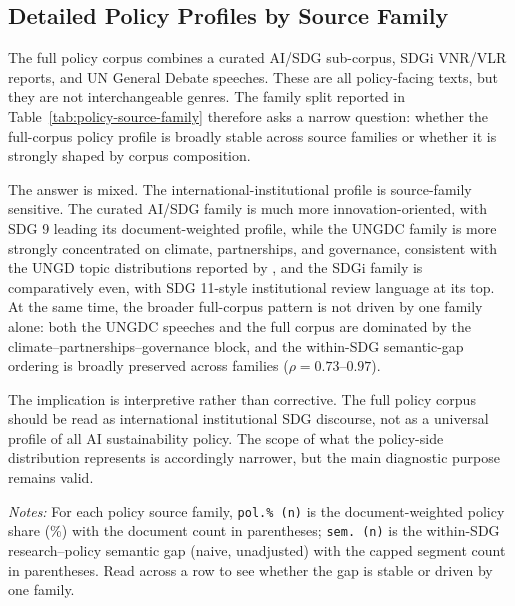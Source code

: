 \documentclass[12pt,a4paper]{article}
\begin{document}
\subsection{Detailed Policy Profiles by Source Family}
\label{app:policy-source-data}

The full policy corpus combines a curated AI/SDG sub-corpus, SDGi VNR/VLR reports, and UN General Debate speeches. These are all policy-facing texts, but they are not interchangeable genres. The family split reported in Table~\ref{tab:policy-source-family} therefore asks a narrow question: whether the full-corpus policy profile is broadly stable across source families or whether it is strongly shaped by corpus composition.

The answer is mixed. The international-institutional profile is source-family sensitive. The curated AI/SDG family is much more innovation-oriented, with SDG 9 leading its document-weighted profile, while the UNGDC family is more strongly concentrated on climate, partnerships, and governance, consistent with the UNGD topic distributions reported by \textcite{JankinEtAl2024}, and the SDGi family is comparatively even, with SDG 11-style institutional review language at its top. At the same time, the broader full-corpus pattern is not driven by one family alone: both the UNGDC speeches and the full corpus are dominated by the climate--partnerships--governance block, and the within-SDG semantic-gap ordering is broadly preserved across families ($\rho = 0.73$--$0.97$).

The implication is interpretive rather than corrective. The full policy corpus should be read as international institutional SDG discourse, not as a universal profile of all AI sustainability policy. The scope of what the policy-side distribution represents is accordingly narrower, but the main diagnostic purpose remains valid.

\begin{table}[ht]
\centering
\caption{Per-SDG policy source-family sensitivity: coverage share and semantic gap.}
\label{tab:policy-source-family}
\resizebox{\textwidth}{!}{}
\par\smallskip\footnotesize\emph{Notes:} For each policy source family, \texttt{pol.\% (n)} is the document-weighted policy share (\%) with the document count in parentheses; \texttt{sem. (n)} is the within-SDG research--policy semantic gap (naive, unadjusted) with the capped segment count in parentheses. Read across a row to see whether the gap is stable or driven by one family.\par
\end{table}
\end{document}

